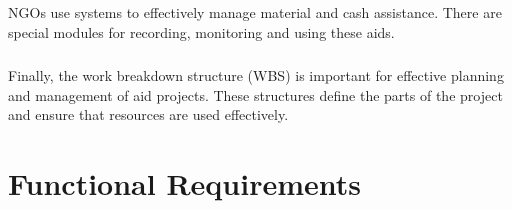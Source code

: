 \documentclass[a4paper,12pt]{report}
\begin{document}
		\paragraph{} NGOs use systems to effectively manage material and cash assistance. There are special modules for recording, monitoring and using these aids.
		\paragraph{} Finally, the work breakdown structure (WBS) is important for effective planning and management of aid projects. These structures define the parts of the project and ensure that resources are used effectively.
  
	\chapter{Functional Requirements}
\end{document}
